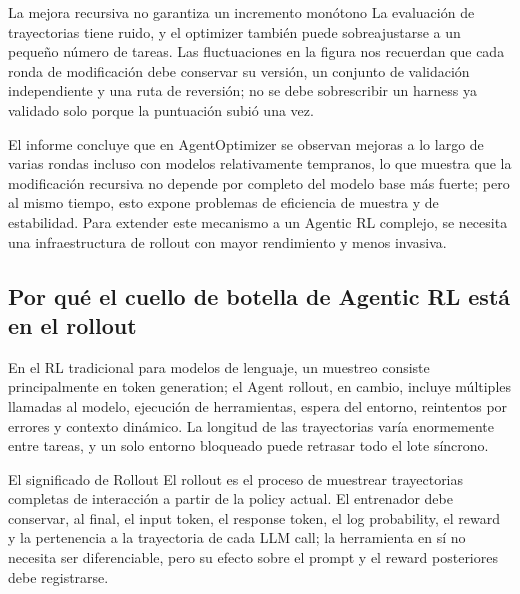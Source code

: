 \begin{warningbox}{La mejora recursiva no garantiza un incremento monótono}
La evaluación de trayectorias tiene ruido, y el optimizer también puede sobreajustarse a un pequeño número de tareas. Las fluctuaciones en la figura nos recuerdan que cada ronda de modificación debe conservar su versión, un conjunto de validación independiente y una ruta de reversión; no se debe sobrescribir un harness ya validado solo porque la puntuación subió una vez.
\end{warningbox}

El informe concluye que en AgentOptimizer se observan mejoras a lo largo de varias rondas incluso con modelos relativamente tempranos, lo que muestra que la modificación recursiva no depende por completo del modelo base más fuerte; pero al mismo tiempo, esto expone problemas de eficiencia de muestra y de estabilidad. Para extender este mecanismo a un Agentic RL complejo, se necesita una infraestructura de rollout con mayor rendimiento y menos invasiva.


\subsection{Por qué el cuello de botella de Agentic RL está en el rollout}

En el RL tradicional para modelos de lenguaje, un muestreo consiste principalmente en token generation; el Agent rollout, en cambio, incluye múltiples llamadas al modelo, ejecución de herramientas, espera del entorno, reintentos por errores y contexto dinámico. La longitud de las trayectorias varía enormemente entre tareas, y un solo entorno bloqueado puede retrasar todo el lote síncrono.


\begin{knowledgebox}{El significado de Rollout}
El rollout es el proceso de muestrear trayectorias completas de interacción a partir de la policy actual. El entrenador debe conservar, al final, el input token, el response token, el log probability, el reward y la pertenencia a la trayectoria de cada LLM call; la herramienta en sí no necesita ser diferenciable, pero su efecto sobre el prompt y el reward posteriores debe registrarse.
\end{knowledgebox}

